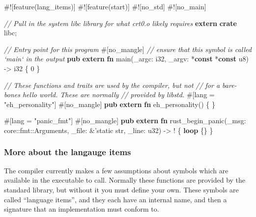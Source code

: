 \documentclass[a4paper,]{book}
\newenvironment{Shaded}{\begin{snugshade}}{\end{snugshade}}
\newcommand{\KeywordTok}[1]{\textcolor[rgb]{0.13,0.29,0.53}{\textbf{{#1}}}}
\newcommand{\DataTypeTok}[1]{\textcolor[rgb]{0.13,0.29,0.53}{{#1}}}
\newcommand{\DecValTok}[1]{\textcolor[rgb]{0.00,0.00,0.81}{{#1}}}
\newcommand{\StringTok}[1]{\textcolor[rgb]{0.31,0.60,0.02}{{#1}}}
\newcommand{\CommentTok}[1]{\textcolor[rgb]{0.56,0.35,0.01}{\textit{{#1}}}}
\newcommand{\OtherTok}[1]{\textcolor[rgb]{0.56,0.35,0.01}{{#1}}}
\newcommand{\AttributeTok}[1]{\textcolor[rgb]{0.77,0.63,0.00}{{#1}}}
\newcommand{\NormalTok}[1]{{#1}}
\begin{document}
\begin{Shaded}
\begin{Highlighting}[]
\AttributeTok{#![}\NormalTok{feature}\AttributeTok{(}\NormalTok{lang_items}\AttributeTok{)]}
\AttributeTok{#![}\NormalTok{feature}\AttributeTok{(}\NormalTok{start}\AttributeTok{)]}
\AttributeTok{#![}\NormalTok{no_std}\AttributeTok{]}
\AttributeTok{#![}\NormalTok{no_main}\AttributeTok{]}

\CommentTok{// Pull in the system libc library for what crt0.o likely requires}
\KeywordTok{extern} \KeywordTok{crate} \NormalTok{libc;}

\CommentTok{// Entry point for this program}
\AttributeTok{#[}\NormalTok{no_mangle}\AttributeTok{]} \CommentTok{// ensure that this symbol is called `main` in the output}
\KeywordTok{pub} \KeywordTok{extern} \KeywordTok{fn} \NormalTok{main(_argc: }\DataTypeTok{i32}\NormalTok{, _argv: *}\KeywordTok{const} \NormalTok{*}\KeywordTok{const} \DataTypeTok{u8}\NormalTok{) -> }\DataTypeTok{i32} \NormalTok{\{}
    \DecValTok{0}
\NormalTok{\}}

\CommentTok{// These functions and traits are used by the compiler, but not}
\CommentTok{// for a bare-bones hello world. These are normally}
\CommentTok{// provided by libstd.}
\AttributeTok{#[}\NormalTok{lang }\AttributeTok{=} \StringTok{"eh_personality"}\AttributeTok{]}
\AttributeTok{#[}\NormalTok{no_mangle}\AttributeTok{]}
\KeywordTok{pub} \KeywordTok{extern} \KeywordTok{fn} \NormalTok{eh_personality() \{}
\NormalTok{\}}

\AttributeTok{#[}\NormalTok{lang }\AttributeTok{=} \StringTok{"panic_fmt"}\AttributeTok{]}
\AttributeTok{#[}\NormalTok{no_mangle}\AttributeTok{]}
\KeywordTok{pub} \KeywordTok{extern} \KeywordTok{fn} \NormalTok{rust_begin_panic(_msg: core::fmt::Arguments,}
                               \NormalTok{_file: &}\OtherTok{'static} \DataTypeTok{str}\NormalTok{,}
                               \NormalTok{_line: }\DataTypeTok{u32}\NormalTok{) -> ! \{}
    \KeywordTok{loop} \NormalTok{\{\}}
\NormalTok{\}}
\end{Highlighting}
\end{Shaded}

\subsubsection{More about the langauge
items}\label{more-about-the-langauge-items}

The compiler currently makes a few assumptions about symbols which are
available in the executable to call. Normally these functions are
provided by the standard library, but without it you must define your
own. These symbols are called ``language items'', and they each have an
internal name, and then a signature that an implementation must conform
to.
\end{document}
